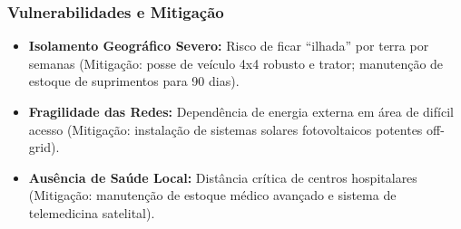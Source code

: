 \subsubsection{Vulnerabilidades e
Mitigação}

\begin{itemize}
\tightlist
\item
  \textbf{Isolamento Geográfico Severo:} Risco de ficar ``ilhada'' por
  terra por semanas (Mitigação: posse de veículo 4x4 robusto e trator;
  manutenção de estoque de suprimentos para 90 dias).
\item
  \textbf{Fragilidade das Redes:} Dependência de energia externa em área
  de difícil acesso (Mitigação: instalação de sistemas solares
  fotovoltaicos potentes off-grid).
\item
  \textbf{Ausência de Saúde Local:} Distância crítica de centros
  hospitalares (Mitigação: manutenção de estoque médico avançado e
  sistema de telemedicina satelital).
\end{itemize}

